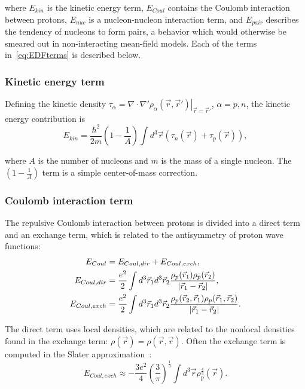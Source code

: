 \noindent where $E_{kin}$ is the kinetic energy term, $E_{Coul}$ contains the Coulomb interaction between protons, $E_{nuc}$ is a nucleon-nucleon interaction term, and $E_{pair}$ describes the tendency of nucleons to form pairs, a behavior which would otherwise be smeared out in non-interacting mean-field models. Each of the terms in~\eqref{eq:EDFterms} is described below.

\subsubsection{Kinetic energy term}

Defining the kinetic density $\tau_\alpha = \left.\nabla\cdot\nabla'\rho_\alpha(\vec{r},\vec{r}')\right|_{\vec{r}=\vec{r}'}$, $\alpha=p,n$, the kinetic energy contribution is
\begin{equation}
E_{kin} = \frac{\hbar^2}{2m} \left(1-\frac{1}{A}\right) \int d^3\vec{r} \left(\tau_n(\vec{r}) + \tau_p(\vec{r}) \right),
\end{equation}

\noindent where $A$ is the number of nucleons and $m$ is the mass of a single nucleon. The $\left(1-\frac{1}{A}\right)$ term is a simple center-of-mass correction.

\subsubsection{Coulomb interaction term}
The repulsive Coulomb interaction between protons is divided into a direct term and an exchange term, which is related to the antisymmetry of proton wave functions:
\begin{align}
E_{Coul} &= E_{Coul, dir} + E_{Coul, exch}, \\
E_{Coul, dir}& = \frac{e^2}{2} \int d^3\vec{r}_1 d^3\vec{r}_2 \frac{\rho_p(\vec{r}_1)\rho_p(\vec{r}_2)}{\abs{\vec{r}_1-\vec{r}_2}}, \\
E_{Coul, exch} &= \frac{e^2}{2} \int d^3\vec{r}_1 d^3\vec{r}_2 \frac{\rho_p(\vec{r}_2,\vec{r}_1)\rho_p(\vec{r}_1,\vec{r}_2)}{\abs{\vec{r}_1-\vec{r}_2}}.
\end{align}

\noindent The direct term uses local densities, which are related to the nonlocal densities found in the exchange term: $\rho(\vec{r}) = \rho(\vec{r},\vec{r})$. Often the exchange term is computed in the Slater approximation~\cite{Slater1951, TitinSchnaider1974}:
\begin{equation}
E_{Coul, exch} \approx -\frac{3e^2}{4} \left(\frac{3}{\pi}\right)^\frac{1}{3} \int d^3\vec{r} \rho_p^\frac{4}{3}(\vec{r}).
\end{equation}


